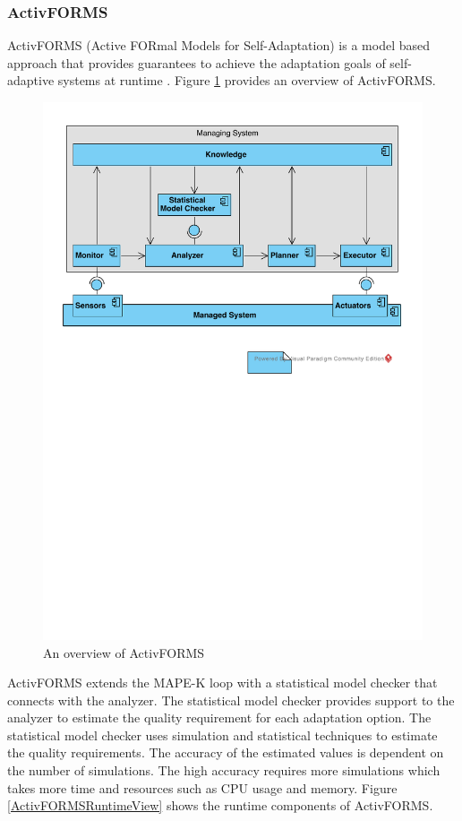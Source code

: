 \documentclass[a4paper,12pt]{article}
\begin{document}
\subsubsection{ActivFORMS} \label{Activforms}
ActivFORMS (Active FORmal Models for Self-Adaptation) is a model based approach that provides guarantees to achieve the adaptation goals of self-adaptive systems at runtime %
. Figure \ref{ActivFORMSOverview} provides an overview of ActivFORMS. 
\begin{figure}[H]
	\centering
	\includegraphics[keepaspectratio, width=\linewidth]{figures/ActivFORMSOverview.pdf}
	\caption{An overview of ActivFORMS}
	\label{ActivFORMSOverview}
\end{figure}
ActivFORMS extends the MAPE-K loop with a statistical model checker that connects with the analyzer. The statistical model checker provides support to the analyzer to estimate the quality requirement for each adaptation option. The statistical model checker uses simulation and statistical techniques to estimate the quality requirements. The accuracy of the estimated values is dependent on the number of simulations. The high accuracy requires more simulations which takes more time and resources such as CPU usage and memory. Figure \ref{ActivFORMSRuntimeView} shows the runtime components of ActivFORMS. 
\end{document}
